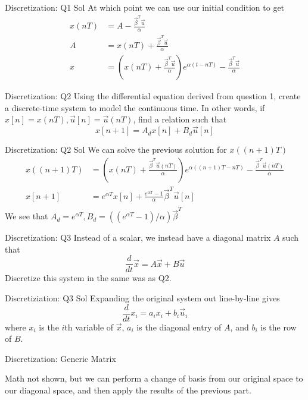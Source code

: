 \documentclass{beamer}
\begin{document}
\begin{frame}{Discretization: Q1 Sol}
	At which point we can use our initial condition to get
	\begin{align*}
	x(nT) &= A - \frac{\vec \beta^T \vec u}{\alpha} \\
	A &= x(nT) + \frac{\vec \beta^T \vec u}{\alpha} \\
	x &= \left( x(nT) + \frac{\vec \beta^T \vec u}{\alpha} \right) e^{\alpha (t - nT)} - \frac{\vec \beta^T \vec u}{\alpha}
	\end{align*}
	\end{frame}\begin{frame}{Discretization: Q2}
	Using the differential equation derived from question 1, create a discrete-time system to model the continuous time. In other words, if $x[n] = x(nT), \vec{u}[n] = \vec{u}(nT)$, find a relation such that
	\[ x[n + 1] = A_d x[n] + B_d \vec{u}[n] \]
	\end{frame}\begin{frame}{Discretization: Q2 Sol}
	We can solve the previous solution for $x((n + 1)T)$
	\begin{align*}
	x((n + 1)T) &= \left( x(nT) + \frac{\vec \beta^T \vec u(nT)}{\alpha} \right) e^{\alpha ((n + 1)T - nT)} - \frac{\vec \beta^T \vec u(nT)}{\alpha} \\
	x[n + 1] &= e^{\alpha T} x[n] + \frac{e^{\alpha T} - 1}{\alpha} \vec{\beta}^T \vec{u}[n] \\
	\end{align*}
	We see that $A_d = e^{\alpha T}, B_d = ((e^{\alpha T} - 1) / \alpha) \vec{\beta}^T$
	\end{frame}\begin{frame}{Discretization: Q3}
	Instead of a scalar, we instead have a diagonal matrix $A$ such that
	\[ \frac{d}{dt} \vec{x} = A \vec{x} + B \vec{u} \]
	Discretize this system in the same was as Q2.
	\end{frame}\begin{frame}{Discretiziation: Q3 Sol}
	Expanding the original system out line-by-line gives
	\[ \frac{d}{dt} x_i = a_i x_i + b_i \vec{u}_i \]
	where $x_i$ is the $i$th variable of $\vec{x}$, $a_i$ is the diagonal entry of $A$, and $b_i$ is the row of $B$.
	\end{frame}
	\begin{frame}{Discretization: Generic Matrix}
	
	Math not shown, but we can perform a change of basis from our original space to our diagonal space, and then apply the results of the previous part.
	
	\end{frame}
	
\end{document}
